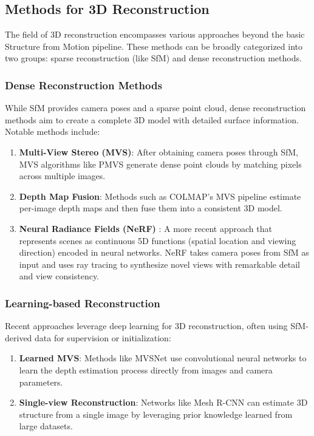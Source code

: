 \subsection{Methods for 3D Reconstruction}

The field of 3D reconstruction encompasses various approaches beyond the basic Structure from Motion pipeline. These methods can be broadly categorized into two groups: sparse reconstruction (like SfM) and dense reconstruction methods.

\subsubsection{Dense Reconstruction Methods}

While SfM provides camera poses and a sparse point cloud, dense reconstruction methods aim to create a complete 3D model with detailed surface information. Notable methods include:

\begin{enumerate}
  \item \textbf{Multi-View Stereo (MVS)}: After obtaining camera poses through SfM, MVS algorithms like PMVS \cite{pmvs} generate dense point clouds by matching pixels across multiple images.

  \item \textbf{Depth Map Fusion}: Methods such as COLMAP's MVS pipeline estimate per-image depth maps and then fuse them into a consistent 3D model.

  \item \textbf{Neural Radiance Fields (NeRF)} \cite{nerf}: A more recent approach that represents scenes as continuous 5D functions (spatial location and viewing direction) encoded in neural networks. NeRF takes camera poses from SfM as input and uses ray tracing to synthesize novel views with remarkable detail and view consistency.
\end{enumerate}

\subsubsection{Learning-based Reconstruction}

Recent approaches leverage deep learning for 3D reconstruction, often using SfM-derived data for supervision or initialization:

\begin{enumerate}
  \item \textbf{Learned MVS}: Methods like MVSNet \cite{mvsnet} use convolutional neural networks to learn the depth estimation process directly from images and camera parameters.

  \item \textbf{Single-view Reconstruction}: Networks like Mesh R-CNN \cite{meshrcnn} can estimate 3D structure from a single image by leveraging prior knowledge learned from large datasets.
\end{enumerate}

